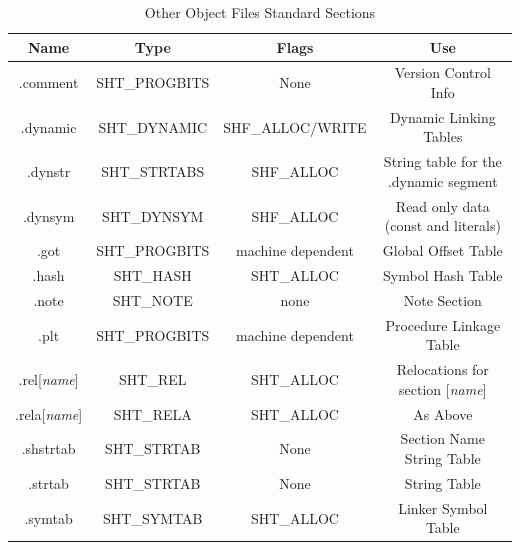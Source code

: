 \documentclass[paper=a4, fontsize=11pt]{report} %
\numberwithin{equation}{section} %
\numberwithin{figure}{section} %
\numberwithin{table}{section} %
\begin{document}
\begin{table}[!htbp]
	\begin{center}
		\begin{tabular}{|c|c|c|c|}
			\hline
			\textbf{Name} & \textbf{Type} & \textbf{Flags} & \textbf{Use}\\ 
			\hline
			{\ttfamily .comment} & {\ttfamily SHT\_PROGBITS} & {\ttfamily 
				None} & Version Control Info\\ \hline
			{\ttfamily .dynamic} & {\ttfamily SHT\_DYNAMIC} & {\ttfamily 
				SHF\_ALLOC/WRITE} & Dynamic Linking Tables\\ \hline
			{\ttfamily .dynstr} & {\ttfamily SHT\_STRTABS} & {\ttfamily 
				SHF\_ALLOC} & String table for the {\ttfamily .dynamic} 
				segment\\ \hline
			{\ttfamily .dynsym} & {\ttfamily SHT\_DYNSYM} & {\ttfamily 
				SHF\_ALLOC} & Read only data (const and literals)\\ \hline
			{\ttfamily .got} & {\ttfamily SHT\_PROGBITS} & {\ttfamily 
				machine dependent} & Global Offset Table\\ \hline
			{\ttfamily .hash} & {\ttfamily SHT\_HASH} & {\ttfamily 
				SHT\_ALLOC} & Symbol Hash Table\\ \hline
			{\ttfamily .note} & {\ttfamily SHT\_NOTE} & {\ttfamily 
				none} & Note Section\\ \hline
			{\ttfamily .plt} & {\ttfamily SHT\_PROGBITS} & {\ttfamily 
				machine dependent} & Procedure Linkage Table\\ \hline
			{\ttfamily .rel[\textit{name}]} & {\ttfamily SHT\_REL} & 
			{\ttfamily SHT\_ALLOC} & Relocations for section [\textit{name}]\\ 
			\hline
			{\ttfamily .rela[\textit{name}]} & {\ttfamily SHT\_RELA} & 
			{\ttfamily SHT\_ALLOC} & As Above \\ 
			\hline
			{\ttfamily .shstrtab} & {\ttfamily SHT\_STRTAB} & {\ttfamily None} 
			& Section Name String Table\\ \hline
			{\ttfamily .strtab} & {\ttfamily SHT\_STRTAB} & {\ttfamily None} & 
			String Table\\ \hline
			{\ttfamily .symtab} & {\ttfamily SHT\_SYMTAB} & {\ttfamily 
			SHT\_ALLOC} & Linker Symbol Table\\ \hline
		\end{tabular}
		\caption{Other Object Files Standard Sections}
		\label{objfile}
	\end{center}
\end{table}
\end{document}
